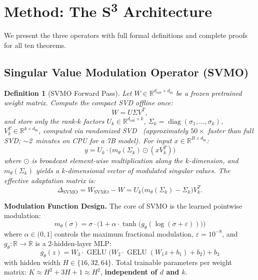 \documentclass[conference]{IEEEtran}
\newtheorem{definition}[theorem]{Definition}
\newcommand{\svmo}{\textsc{SVMO}}
\newcommand{\sthree}{S\textsuperscript{3}}
\newcommand{\RR}{\mathbb{R}}
\newcommand{\diag}{\operatorname{diag}}
\newcommand{\GELU}{\operatorname{GELU}}
\begin{document}
\section{Method: The \sthree{} Architecture}

We present the three operators with full formal definitions and complete proofs for all ten theorems.

\subsection{Singular Value Modulation Operator (\svmo)}
\label{sec:svmo}

\begin{definition}[\svmo{} Forward Pass]
Let $W \in \RR^{d_{\text{out}} \times d_{\text{in}}}$ be a frozen pretrained weight matrix. Compute the compact SVD offline \textit{once}:
\begin{equation}
W = U\Sigma V^T,
\end{equation}
and store only the rank-$k$ factors $U_k \in \RR^{d_{\text{out}} \times k}$, $\Sigma_k = \diag(\sigma_1,\dots,\sigma_k)$, $V_k^T \in \RR^{k \times d_{\text{in}}}$, computed via randomized SVD~\cite{halko2011randomized} (approximately $50\times$ faster than full SVD; $\sim$2~minutes on CPU for a 7B model). For input $x \in \RR^{B \times d_{\text{in}}}$:
\begin{equation}
y = U_k \cdot \big(m_\theta(\Sigma_k) \odot (x V_k^T)\big)
\end{equation}
where $\odot$ is broadcast element-wise multiplication along the $k$-dimension, and $m_\theta(\Sigma_k)$ yields a $k$-dimensional vector of modulated singular values. The effective adaptation matrix is:
\begin{equation}
\Delta_{\text{SVMO}} = W_{\text{SVMO}} - W = U_k\big(m_\theta(\Sigma_k) - \Sigma_k\big)V_k^T.
\end{equation}
\end{definition}

\textbf{Modulation Function Design.} The core of \svmo{} is the learned pointwise modulation:
\begin{equation}
m_\theta(\sigma) = \sigma \cdot \big(1 + \alpha \cdot \tanh\!\big(g_\theta(\log(\sigma + \varepsilon))\big)\big)
\end{equation}
where $\alpha \in (0,1]$ controls the maximum fractional modulation, $\varepsilon = 10^{-8}$, and $g_\theta: \RR \to \RR$ is a 2-hidden-layer MLP:
\begin{equation}
g_\theta(z) = W_3 \cdot \GELU\big(W_2 \cdot \GELU(W_1 z + b_1) + b_2\big) + b_3
\end{equation}
with hidden width $H \in \{16, 32, 64\}$. Total trainable parameters per weight matrix: $K \approx H^2 + 3H + 1 \approx H^2$, \textbf{independent of $d$ and $k$}.
\end{document}
